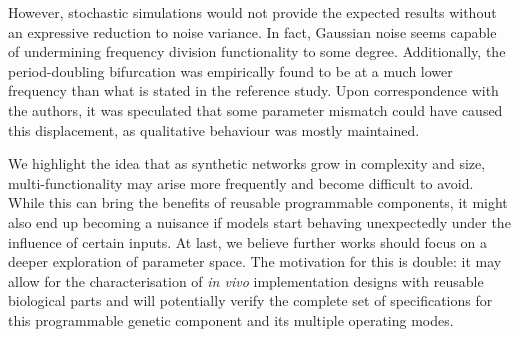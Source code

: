   However, stochastic simulations would not provide the expected results without an expressive reduction to noise variance.
  In fact, Gaussian noise seems capable of undermining frequency division functionality to some degree.
  Additionally, the period-doubling bifurcation was empirically found to be at a much lower frequency than what is stated in the reference study.
  Upon correspondence with the authors, it was speculated that some parameter mismatch could have caused this displacement, as qualitative behaviour was mostly maintained.

  We highlight the idea that as synthetic networks grow in complexity and size, multi-functionality may arise more frequently and become difficult to avoid.
  While this can bring the benefits of reusable programmable components, it might also end up becoming a nuisance if models start behaving unexpectedly under the influence of certain inputs.
  At last, we believe further works should focus on a deeper exploration of parameter space.
  The motivation for this is double: it may allow for the characterisation of \textit{in vivo} implementation designs with reusable biological parts and will potentially verify the complete set of specifications for this programmable genetic component and its multiple operating modes.
